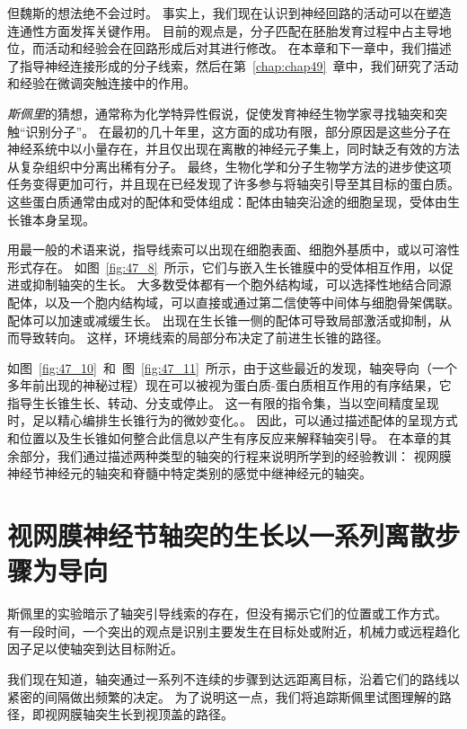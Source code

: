 但魏斯的想法绝不会过时。
事实上，我们现在认识到神经回路的活动可以在塑造连通性方面发挥关键作用。
目前的观点是，分子匹配在胚胎发育过程中占主导地位，而活动和经验会在回路形成后对其进行修改。
在本章和下一章中，我们描述了指导神经连接形成的分子线索，然后在第~\ref{chap:chap49}~章中，我们研究了活动和经验在微调突触连接中的作用。


\textit{斯佩里}的猜想，通常称为化学特异性假说，促使发育神经生物学家寻找轴突和突触“识别分子”。
在最初的几十年里，这方面的成功有限，部分原因是这些分子在神经系统中以小量存在，并且仅出现在离散的神经元子集上，同时缺乏有效的方法从复杂组织中分离出稀有分子。
最终，生物化学和分子生物学方法的进步使这项任务变得更加可行，并且现在已经发现了许多参与将轴突引导至其目标的蛋白质。
这些蛋白质通常由成对的配体和受体组成：配体由轴突沿途的细胞呈现，受体由生长锥本身呈现。


用最一般的术语来说，指导线索可以出现在细胞表面、细胞外基质中，或以可溶性形式存在。
如图~\ref{fig:47_8}~所示，它们与嵌入生长锥膜中的受体相互作用，以促进或抑制轴突的生长。
大多数受体都有一个胞外结构域，可以选择性地结合同源配体，以及一个胞内结构域，可以直接或通过第二信使等中间体与细胞骨架偶联。
配体可以加速或减缓生长。
出现在生长锥一侧的配体可导致局部激活或抑制，从而导致转向。
这样，环境线索的局部分布决定了前进生长锥的路径。


如图~\ref{fig:47_10}~和~图~\ref{fig:47_11}~所示，由于这些最近的发现，轴突导向（一个多年前出现的神秘过程）现在可以被视为蛋白质-蛋白质相互作用的有序结果，它指导生长锥生长、转动、分支或停止。
这一有限的指令集，当以空间精度呈现时，足以精心编排生长锥行为的微妙变化。。
因此，可以通过描述配体的呈现方式和位置以及生长锥如何整合此信息以产生有序反应来解释轴突引导。
在本章的其余部分，我们通过描述两种类型的轴突的行程来说明所学到的经验教训：
视网膜神经节神经元的轴突和脊髓中特定类别的感觉中继神经元的轴突。



\section{视网膜神经节轴突的生长以一系列离散步骤为导向}

斯佩里的实验暗示了轴突引导线索的存在，但没有揭示它们的位置或工作方式。
有一段时间，一个突出的观点是识别主要发生在目标处或附近，机械力或远程趋化因子足以使轴突到达目标附近。


我们现在知道，轴突通过一系列不连续的步骤到达远距离目标，沿着它们的路线以紧密的间隔做出频繁的决定。
为了说明这一点，我们将追踪斯佩里试图理解的路径，即视网膜轴突生长到视顶盖的路径。



